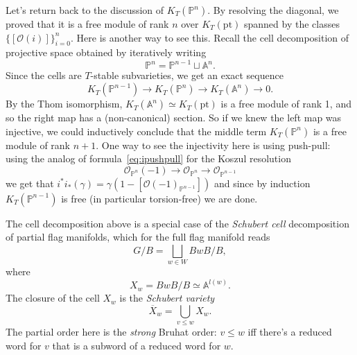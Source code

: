 \documentclass[11pt]{amsart}
\theoremstyle{definition}
\newcommand{\bP}{\mathbb{P}}
\newcommand{\Oc}{\mathcal{O}}
\numberwithin{equation}{subsection}
\numberwithin{figure}{subsection}
\newcommand{\pt}{\mathrm{pt}}
\begin{document}


Let's return back to the discussion of $K_T(\bP^n)$. By resolving the diagonal, we proved that it is a free module of rank $n$ over $K_T(\pt)$ spanned by the classes $\{[\Oc(i)]\}_{i=0}^n$. Here is another way to see this. Recall the cell decomposition of projective space obtained by iteratively writing
$$
\mathbb{P}^{n} = \mathbb{P}^{n-1}\sqcup \mathbb{A}^n.
$$
Since the cells are $T$-stable subvarieties, we get an exact sequence
$$
K_T(\mathbb{P}^{n-1})\rightarrow K_T(\mathbb{P}^{n})\rightarrow K_T(\mathbb{A}^{n})\rightarrow 0.
$$
By the Thom isomorphism, $ K_T(\mathbb{A}^{n})\simeq K_T(\pt)$ is a free module of rank 1, and so the right map has a (non-canonical) section. So if we knew the left map was injective, we could inductively conclude that the middle term $K_T(\mathbb{P}^{n})$ is a free module of rank $n+1$. One way to see the injectivity here is using push-pull: using the analog of formula~\eqref{eq:ipushpull} for the Koszul resolution
$$
\Oc_{\bP^n}(-1)\rightarrow\Oc_{\bP^n}\rightarrow \Oc_{\bP^{n-1}}
$$
we get that $i^*i_*(\gamma)=\gamma(1-[\Oc(-1)_{\bP^{n-1}}])$ and since by induction $K_T(\mathbb{P}^{n-1})$ is free (in particular torsion-free) we are done. 

The cell decomposition above is a special case of the \emph{Schubert cell} decomposition of partial flag manifolds, which for the full flag manifold reads
$$
G/B = \bigsqcup_{w\in W} BwB/B,
$$
where
$$
X_w=BwB/B \simeq \mathbb{A}^{l(w)}.
$$
The closure of the cell $X_w$ is the \emph{Schubert variety}
$$
\overline{X}_w = \bigcup_{v\leq w} X_w.
$$
The partial order here is the \emph{strong} Bruhat order: $v\leq w$ iff there's a reduced word for $v$ that is a subword of a reduced word for $w$.
\end{document}
